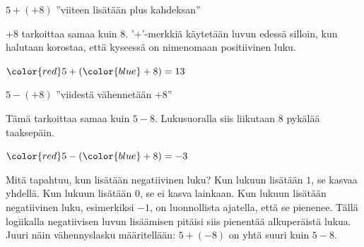     $5+(+8)$ ''viiteen lisätään plus kahdeksan''
    
    $+8$ tarkoittaa samaa kuin $8$. '$+$'-merkkiä käytetään luvun edessä silloin, kun halutaan korostaa, että kyseessä on nimenomaan positiivinen luku.
    
    
    \begin{center}
          \begin{lukusuora}{-1}{14}{14}
        {\color{red} }
        \lukusuorauusi
        {\color{red} }
        {\color{blue} }
       \end{lukusuora}
       ${\color{red}5}+({\color{blue}+8})=13$
    \end{center}
    
    $5-(+8)$ ''viidestä vähennetään $+8$''
    
    Tämä tarkoittaa samaa kuin $5-8$. Lukusuoralla siis liikutaan 8 pykälää taaksepäin.

\vspace{0.3cm}     
    
    \begin{center}
              \begin{lukusuora}{-4}{8}{14}
        {\color{blue} }
        \lukusuorauusi
        {\color{red} }
       \end{lukusuora}
       ${\color{red}5}-({\color{blue}+8})=-3$
    \end{center}


    
    Mitä tapahtuu, kun lisätään negatiivinen luku? Kun lukuun lisätään $1$, se kasvaa yhdellä. Kun lukuun lisätään $0$, se ei kasva lainkaan. Kun lukuun lisätään negatiivinen luku, esimerkiksi $-1$, on luonnollista ajatella, että se pienenee. Tällä logiikalla negatiivisen luvun lisäämisen pitäisi siis pienentää alkuperäistä lukua. Juuri näin vähennyslasku määritellään: $5+(-8)$ on yhtä suuri kuin $5-8$.
    
\vspace{0.3cm}     

